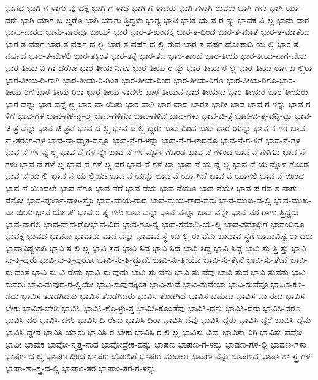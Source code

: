 {ಭಾಗದ
ಭಾಗಿ-ಗ-ಳಾಗು-ವು-ದಕ್ಕೆ
ಭಾಗಿ-ಗ-ಳಾದ
ಭಾಗಿ-ಗ-ಳಾದರು
ಭಾಗಿ-ಗಳಾಗಿ-ರುವರು
ಭಾಗಿ-ಗಳು
ಭಾಗಿ-ಯಾ-ದರು
ಭಾಗಿ-ಯಾಗ-ಬ-ಲ್ಲರೊ
ಭಾಗಿ-ಯಾಗು-ತ್ತಿದ್ದಳು
ಭಾಗ್ಯ
ಭಾಟಿ
ಭಾಟೆ-ಯ-ವ-ರ-ನ್ನು
ಭಾದಕ-ವಿ-ಲ್ಲ
ಭಾನು-ವಾರ
ಭಾನು-ವಾರದ
ಭಾನು-ವಾರವೂ
ಭಾಯ್
ಭಾರ
ಭಾರ-ತ-ಖಂಡಕ್ಕೆ
ಭಾರ-ತ-ದಿಂದ
ಭಾರ-ತ-ಮಾತೆ
ಭಾರ-ತ-ಮಾತೆಯ
ಭಾರ-ತ-ವರ್ಷ
ಭಾರ-ತ-ವರ್ಷ-ದ-ಲ್ಲಿ
ಭಾರ-ತ-ವರ್ಷ-ದ-ಲ್ಲಿ-ರುವ
ಭಾರ-ತ-ವರ್ಷ-ದೋಪಾದಿ-ಯ-ಲ್ಲಿ
ಭಾರ-ತ-ವರ್ಷದ
ಭಾರ-ತ-ವೇಳಲಿ
ಭಾರ-ತಕ್ಕಿಂತ
ಭಾರ-ತಕ್ಕೆ
ಭಾರ-ತದ
ಭಾರ-ತಾಂಬೆ
ಭಾರ-ತೀಯ
ಭಾರ-ತೀಯ-ನಾಗ-ಬೇಕು
ಭಾರ-ತೀಯ-ನಿ-ಗಾ-ದರೋ
ಭಾರ-ತೀಯ-ನಿಗೂ
ಭಾರ-ತೀಯ-ರ-ನ್ನು
ಭಾರ-ತೀಯ-ರ-ಲ್ಲಿ
ಭಾರ-ತೀಯ-ರಾಗ-ಬ-ಲ್ಲಿರಾ
ಭಾರ-ತೀಯ-ರಿ-ಗಾಗಿ
ಭಾರ-ತೀಯ-ರಿ-ಗಿಂತ
ಭಾರ-ತೀಯ-ರಿಂದ
ಭಾರ-ತೀಯ-ರಿಗೂ
ಭಾರ-ತೀಯ-ರಿಗೂ-ಭಾರ-ತೀಯ-ರಿಗೆ
ಭಾರ-ತೀಯ-ರಿರಾ
ಭಾರ-ತೀಯ-ಳಾದಳು
ಭಾರ-ತೀಯನ
ಭಾರ-ತೀಯನು
ಭಾರ-ತೀಯರ
ಭಾರ-ತೀಯರು
ಭಾರ-ವನ್ನು
ಭಾರ-ವನ್ನೆ-ಲ್ಲ
ಭಾರ-ವಾ-ಯಿತು
ಭಾರ-ವಾಗಿ
ಭಾರ-ವಾದ
ಭಾರತ
ಭಾರೀ
ಭಾವ
ಭಾವ-ಗ-ಳನ್ನು
ಭಾವ-ಗ-ಳಿಗೆ
ಭಾವ-ಗಳ
ಭಾವ-ಗಳ-ನ್ನೆ-ಲ್ಲ
ಭಾವ-ಗಳಿಗೂ
ಭಾವ-ಗಳಿವೆ
ಭಾವ-ಗಳು
ಭಾವ-ಚಿ-ತ್ರ
ಭಾವ-ಚಿ-ತ್ರ-ವನ್ನಿ-ಟ್ಟು
ಭಾವ-ಚಿ-ತ್ರ-ವನ್ನು
ಭಾವ-ಚಿ-ತ್ರವೆ
ಭಾವ-ದ-ಲ್ಲಿ
ಭಾವ-ದ-ಲ್ಲಿ-ದ್ದರು
ಭಾವ-ದಿಂದ
ಭಾವ-ಧಾರೆ-ಯನ್ನು
ಭಾವ-ನ-ಗರ
ಭಾವ-ನಾ-ತರಂಗ-ಗಳ
ಭಾವ-ನಾ-ಮೃತ-ವನ್ನೂ
ಭಾವ-ನೆ-ಗ-ಳನ್ನು
ಭಾವ-ನೆ-ಗ-ಳಾದರೊ
ಭಾವ-ನೆ-ಗ-ಳಿಗೆ
ಭಾವ-ನೆ-ಗಳ
ಭಾವ-ನೆ-ಗಳ-ನ್ನೆ-ಲ್ಲ
ಭಾವ-ನೆ-ಗಳ-ನ್ನೇ
ಭಾವ-ನೆ-ಗಳ-ನ್ನೊಳ-ಗೊಂಡ
ಭಾವ-ನೆ-ಗಳಿಂದ
ಭಾವ-ನೆ-ಗಳಿಗೂ
ಭಾವ-ನೆ-ಗಳು
ಭಾವ-ನೆ-ಗಳೆ-ಲ್ಲ
ಭಾವ-ನೆ-ಗಳೆ-ಲ್ಲ-ದರ
ಭಾವ-ನೆ-ಗಳೆ-ಲ್ಲಾ
ಭಾವ-ನೆ-ಯ-ನ್ನೆ-ಲ್ಲ
ಭಾವ-ನೆ-ಯ-ನ್ನೊಳ-ಗೊಂಡ
ಭಾವ-ನೆ-ಯ-ಲ್ಲಿ
ಭಾವ-ನೆ-ಯ-ಲ್ಲಿಯೇ
ಭಾವ-ನೆ-ಯನ್ನು
ಭಾವ-ನೆ-ಯಾ-ಗಿದೆ
ಭಾವ-ನೆ-ಯಾಗಲಿ
ಭಾವ-ನೆ-ಯಿಂದ
ಭಾವ-ನೆ-ಯಿಂದಲೇ
ಭಾವ-ನೆಗೂ
ಭಾವ-ನೆಗೆ
ಭಾವ-ನೆಯ
ಭಾವ-ನೆಯೂ
ಭಾವ-ನೆಯೇ
ಭಾವ-ಪ-ರವ-ಶ-ನಾಗು-ವೆನೋ
ಭಾವ-ಪೂರ್ಣ-ವಾಗಿ-ತ್ತೊ
ಭಾವ-ಮಯ-ರಾದ
ಭಾವ-ಮಯ-ರಾದ-ವರು
ಭಾವ-ಮುಖ-ದ-ಲ್ಲಿ
ಭಾವ-ಮುಖ-ವಾ-ಯಿತು
ಭಾವ-ಯೇ-ತ್
ಭಾವ-ರ-ತ್ನ-ಗಳು
ಭಾವ-ವನ್ನು
ಭಾವ-ವನ್ನೂ
ಭಾವ-ವನ್ನೇ
ಭಾವ-ವಶ-ರಾಗು-ತ್ತಿದ್ದರು
ಭಾವ-ವಾಗಲಿ
ಭಾವ-ವಾದ-ರೋಭಾವ-ವಿದೆ
ಭಾವ-ಶೂ-ನ್ಯ
ಭಾವ-ಸಮಾಧಿ-ಯ-ಲ್ಲಿ
ಭಾವ-ಸಮಾಧಿಗೆ
ಭಾವಂದಿರೂ
ಭಾವಕ್ಕೆ
ಭಾವದ
ಭಾವನಾ
ಭಾವಾನು-ವಾದ-ವನ್ನು
ಭಾವಾವ-ಸ್ಥೆ-ಯ-ಲ್ಲಿ-ರು-ವೆನು
ಭಾವಾವ-ಸ್ಥೆಗೆ
ಭಾವಾವಿಷ್ಟ-ರಾ-ದರು
ಭಾವಾವಿಷ್ಟಳಾಗಿ
ಭಾವಿ-ಸ-ಲಿ-ಲ್ಲ
ಭಾವಿ-ಸದ
ಭಾವಿ-ಸಿದ
ಭಾವಿ-ಸಿದೆ
ಭಾವಿ-ಸಿದ್ದ
ಭಾವಿ-ಸಿದ್ದೆ
ಭಾವಿ-ಸು-ತ್ತಿ-ತ್ತು
ಭಾವಿ-ಸು-ತ್ತಿ-ದ್ದರು
ಭಾವಿ-ಸು-ತ್ತಿ-ದ್ದರೋ
ಭಾವಿ-ಸು-ತ್ತಿ-ದ್ದುದೇ
ಭಾವಿ-ಸು-ತ್ತೀಯೊ
ಭಾವಿ-ಸು-ತ್ತೇನೆ
ಭಾವಿ-ಸು-ತ್ತೇವೆ
ಭಾವಿ-ಸು-ವಂತೆ
ಭಾವಿ-ಸು-ವಿ-ರೇನು
ಭಾವಿ-ಸು-ವುದು
ಭಾವಿ-ಸು-ವೆನು
ಭಾವಿ-ಸು-ವೆವು
ಭಾವಿ-ಸುವ
ಭಾವಿ-ಸುವನು
ಭಾವಿ-ಸುವರು
ಭಾವಿ-ಸುವುದ-ರ-ಲ್ಲಿಯೇ
ಭಾವಿ-ಸುವುದಕ್ಕಿಂತ
ಭಾವಿ-ಸುವೆ
ಭಾವಿ-ಸುವೆಯಾ
ಭಾವಿ-ಸುವೆವೂ
ಭಾವಿಸ-ಕೂ-ಡದು
ಭಾವಿಸ-ತೊಡಗಿದನು
ಭಾವಿಸ-ತೊಡಗಿದರು
ಭಾವಿಸ-ತೊಡಗಿದೆ
ಭಾವಿಸ-ಬಹುದು
ಭಾವಿಸ-ಬಾ-ರದು
ಭಾವಿಸ-ಬೇಕು
ಭಾವಿಸ-ಬೇಡಿ
ಭಾವಿಸಿ
ಭಾವಿಸಿ-ಕೊ-ಳ್ಳು-ತ್ತ
ಭಾವಿಸಿ-ಕೊಂಡೆವು
ಭಾವಿಸಿ-ದನು
ಭಾವಿಸಿ-ದರು
ಭಾವಿಸಿ-ದರೂ
ಭಾವಿಸಿ-ದರೆ
ಭಾವಿಸಿ-ದಳು
ಭಾವಿಸಿ-ದಿ-ರೇನು
ಭಾವಿಸಿ-ದಿರಾ
ಭಾವಿಸಿ-ದೆವು
ಭಾವಿಸಿ-ದ್ದರು
ಭಾವಿಸಿ-ದ್ದರೆ
ಭಾವಿಸಿ-ದ್ದೆನು
ಭಾವಿಸಿ-ದ್ದೇನೆ
ಭಾವಿಸಿ-ಯಾರು
ಭಾವಿಸಿ-ರ-ಬೇಕು
ಭಾವಿಸಿ-ರ-ಲಿ-ಲ್ಲ
ಭಾವಿಸು-ವಿರಾ
ಭಾವಿಸು-ವಿರಿ
ಭಾವಿಸು-ವೆವೋ
ಭಾವೀ
ಭಾವುಕ
ಭಾವೋ-ನ್ಮತ್ತ-ನಾದ
ಭಾವೋದ್ರೇಕ-ವನ್ನು
ಭಾಷಣ
ಭಾಷಣ-ಗ-ಳನ್ನು
ಭಾಷಣ-ಗಳ-ಲ್ಲಿ
ಭಾಷಣ-ಗಳು
ಭಾಷಣ-ದ-ಲ್ಲಿ
ಭಾಷಣ-ದಿಂದ
ಭಾಷಣ-ದೊಂದಿಗೆ
ಭಾಷಣ-ಮಾಡಲು
ಭಾಷಣ-ವನ್ನು
ಭಾಷಣದ
ಭಾಷಾ-ಶಾ-ಸ್ತ್ರ-ಗಳ
ಭಾಷಾ-ಶಾ-ಸ್ತ್ರ-ದ-ಲ್ಲಿ
ಭಾಷಾಂ-ತರ
ಭಾಷಾಂ-ತರ-ಗ-ಳನ್ನು
}
